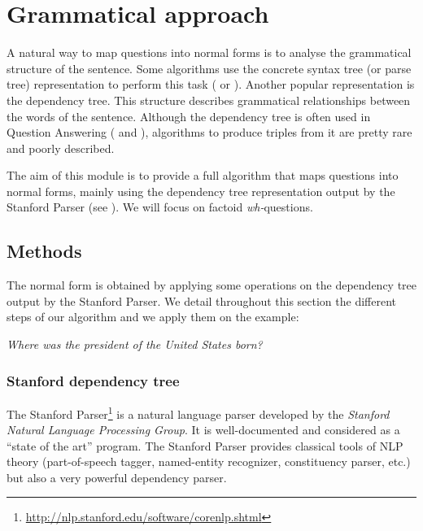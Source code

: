 \section{Grammatical approach}
\label{gramap}

A natural way to map questions into normal forms is to analyse the grammatical structure of the sentence. Some algorithms use the concrete syntax tree (or parse tree) representation to perform this task (\cite{parsetree} or \cite{parsetree2}). Another popular representation is the dependency tree. This structure describes grammatical relationships between the words of the sentence. Although the dependency tree is often used in Question Answering (\cite{Zouaq1} and \cite{Zouaq2}), algorithms to produce triples from it are pretty rare and poorly described.

The aim of this module is to provide a full algorithm that maps questions into normal forms, mainly using the dependency tree representation output by the Stanford Parser (see \cite{stanfordmanual}). We will focus on factoid \textit{wh-}questions.


\subsection{Methods}
\label{met}

The normal form is obtained by applying some operations on the dependency tree output by the Stanford Parser. We detail throughout this section the different steps of our algorithm and we apply them on the example:
\begin{center}
 \textit{Where was the president of the United States born?}
\end{center}


\subsubsection{Stanford dependency tree}
\label{sdt}

The Stanford Parser\footnote{\url{http://nlp.stanford.edu/software/corenlp.shtml}} is a natural language parser developed by the \emph{Stanford Natural Language Processing Group}. It is well-documented and considered as a ``state of the art'' program. The Stanford Parser provides classical tools of NLP theory (part-of-speech  tagger, named-entity recognizer, constituency parser, etc.) but also a very powerful dependency parser.

